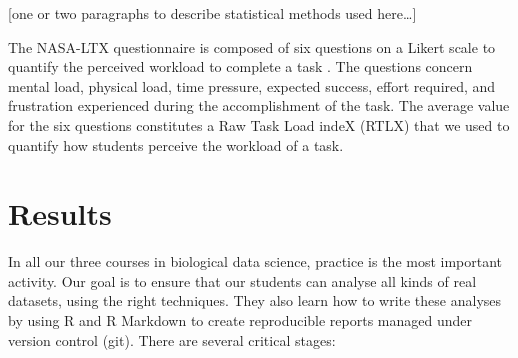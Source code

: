 \documentclass{aims}
\theoremstyle{definition}
\begin{document}
{[}one or two paragraphs to describe statistical methods used
here\ldots{]}

The NASA-LTX questionnaire is composed of six questions on a Likert
scale to quantify the perceived workload to complete a task
\cite{Hart1988}. The questions concern mental load, physical load, time
pressure, expected success, effort required, and frustration experienced
during the accomplishment of the task. The average value for the six
questions constitutes a Raw Task Load indeX (RTLX) \cite{Byers1989} that
we used to quantify how students perceive the workload of a task.

\hypertarget{results}{%
\section{Results}\label{results}}

In all our three courses in biological data science, practice is the
most important activity. Our goal is to ensure that our students can
analyse all kinds of real datasets, using the right techniques. They
also learn how to write these analyses by using R and R Markdown to
create reproducible reports managed under version control (git). There
are several critical stages:
\end{document}
